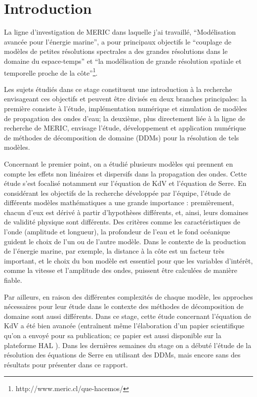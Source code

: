\section{Introduction}

\indent La ligne d'investigation de MERIC dans laquelle j'ai travaillé, ``Modélisation avancée pour l'énergie marine'', a pour principaux objectifs le ``couplage de modèles de petites résolutions spectrales a des grandes résolutions dans le domaine du espace-temps'' et ``la modélisation de grande résolution spatiale et temporelle proche de la côte''\footnote{http://www.meric.cl/que-hacemos/}.

\indent Les sujets étudiés dans ce stage constituent une introduction à la recherche envisageant ces objectifs et peuvent être divisés en deux branches principales: la première consiste à l'étude, implémentation numérique et simulation de modèles de propagation des ondes d'eau; la deuxième, plus directement liée à la ligne de recherche de MERIC, envisage l'étude, développement et application numérique de méthodes de décomposition de domaine (DDMs) pour la résolution de tels modèles.

\indent Concernant le premier point, on a étudié plusieurs modèles qui prennent en compte les effets non linéaires et dispersifs dans la propagation des ondes. Cette étude s'est focalisé notamment sur l'équation de KdV et l'équation de Serre. En considérant les objectifs de la recherche développée par l'équipe, l'étude de différents modèles mathématiques a une grande importance : premièrement, chacun d'eux est dérivé à partir d'hypothèses différents, et, ainsi, leurs domaines de validité physique sont différents. Des critères comme les caractéristiques de l'onde (amplitude et longueur), la profondeur de l'eau et le fond océanique guident le choix de l'un ou de l'autre modèle. Dans le contexte de la production de l'énergie marine, par exemple, la distance à la côte est un facteur très important, et le choix du bon modèle est essentiel pour que les variables d'intérêt, comme la vitesse et l'amplitude des ondes, puissent être calculées de manière fiable.

\indent Par ailleurs, en raison des différentes complexités de chaque modèle, les approches nécessaires pour leur étude dans le contexte des méthodes de décomposition de domaine sont aussi différents. Dans ce stage, cette étude concernant l'équation de KdV a été bien avancée (entraînent même l'élaboration d'un papier scientifique qu'on a envoyé pour sa publication; ce papier est aussi disponible sur la plateforme HAL \cite{joao2016}). Dans les dernières semaines du stage on a débuté l'étude de la résolution des équations de Serre en utilisant des DDMs, mais encore sans des résultats pour présenter dans ce rapport.


